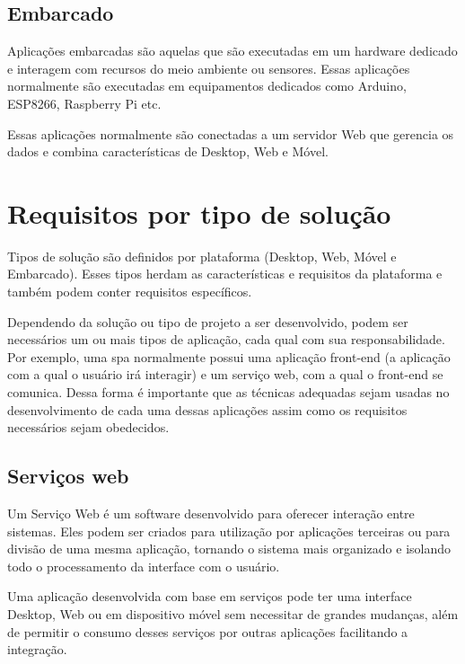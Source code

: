\subsection{Embarcado}

Aplicações embarcadas são aquelas que são executadas em um hardware dedicado e interagem com recursos do meio ambiente ou sensores. Essas aplicações normalmente são executadas em equipamentos dedicados como Arduino, ESP8266, Raspberry Pi etc.

Essas aplicações normalmente são conectadas a um servidor Web que gerencia os dados e combina características de Desktop, Web e Móvel.



\section{Requisitos por tipo de solução}

Tipos de solução são definidos por plataforma (Desktop, Web, Móvel e Embarcado). Esses tipos herdam as características e requisitos da plataforma e também podem conter requisitos específicos.

Dependendo da solução ou tipo de projeto a ser desenvolvido, podem ser necessários um ou mais tipos de aplicação, cada qual com sua responsabilidade. Por exemplo, uma \acs{spa} normalmente possui uma aplicação front-end (a aplicação com a qual o usuário irá interagir) e um serviço web, com a qual o front-end se comunica. Dessa forma é importante que as técnicas adequadas sejam usadas no desenvolvimento de cada uma dessas aplicações assim como os requisitos necessários sejam obedecidos.




\subsection{Serviços web}
Um Serviço Web é um software desenvolvido para oferecer interação entre sistemas. Eles podem ser criados para utilização por aplicações terceiras ou para divisão de uma mesma aplicação, tornando o sistema mais organizado e isolando todo o processamento da interface com o usuário. 

Uma aplicação desenvolvida com base em serviços pode ter uma interface Desktop, Web ou em dispositivo móvel sem necessitar de grandes mudanças, além de permitir o consumo desses serviços por outras aplicações facilitando a integração.

